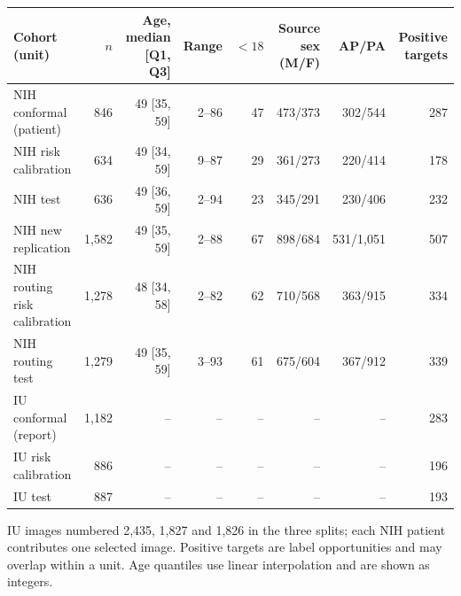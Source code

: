 \begin{tabular}{lrrrrrrr}
\toprule
Cohort (unit) & $n$ & Age, median [Q1, Q3] & Range & $<18$ & Source sex (M/F) & AP/PA & Positive targets\\
\midrule
NIH conformal (patient) & 846 & 49 [35, 59] & 2--86 & 47 & 473/373 & 302/544 & 287\\
NIH risk calibration & 634 & 49 [34, 59] & 9--87 & 29 & 361/273 & 220/414 & 178\\
NIH test & 636 & 49 [36, 59] & 2--94 & 23 & 345/291 & 230/406 & 232\\
NIH new replication & 1,582 & 49 [35, 59] & 2--88 & 67 & 898/684 & 531/1,051 & 507\\
NIH routing risk calibration & 1,278 & 48 [34, 58] & 2--82 & 62 & 710/568 & 363/915 & 334\\
NIH routing test & 1,279 & 49 [35, 59] & 3--93 & 61 & 675/604 & 367/912 & 339\\
IU conformal (report) & 1,182 & -- & -- & -- & -- & -- & 283\\
IU risk calibration & 886 & -- & -- & -- & -- & -- & 196\\
IU test & 887 & -- & -- & -- & -- & -- & 193\\
\bottomrule
\end{tabular}\par\vspace{3pt}
\noindent\footnotesize IU images numbered 2,435, 1,827 and 1,826 in the three splits; each NIH patient contributes one selected image. Positive targets are label opportunities and may overlap within a unit. Age quantiles use linear interpolation and are shown as integers.

